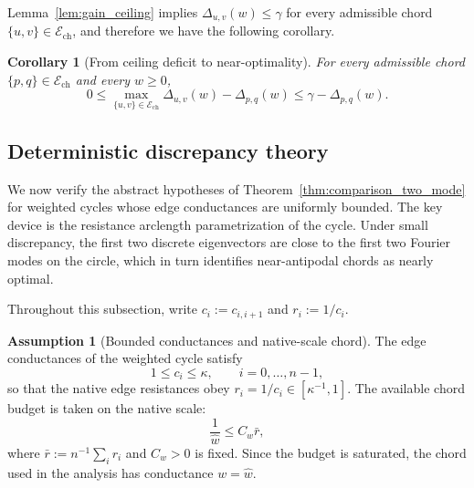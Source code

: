 \documentclass[11pt]{article}
\numberwithin{equation}{section}
\newtheorem{corollary}[theorem]{Corollary}
\theoremstyle{definition}
\newtheorem{assumption}[theorem]{Assumption}
\theoremstyle{remark}
\begin{document}
Lemma~\ref{lem:gain_ceiling} implies
$\Delta_{u,v}(w)\le \gamma$ for every admissible chord
$\{u,v\}\in\mathcal{E}_{\mathrm{ch}}$, and therefore we have the following corollary.

\begin{corollary}[From ceiling deficit to near-optimality]\label{cor:ceiling_to_opt}
	For every admissible chord $\{p,q\}\in\mathcal{E}_{\mathrm{ch}}$ and every $w\ge 0$,
	\begin{equation}\label{eq:near_opt_from_ceiling}
		0\le
		\max_{\{u,v\}\in\mathcal{E}_{\mathrm{ch}}}\Delta_{u,v}(w)-\Delta_{p,q}(w)
		\le
		\gamma-\Delta_{p,q}(w).
	\end{equation}
\end{corollary}



\subsection{Deterministic discrepancy theory}\label{subsec:deterministic_discrepancy}

We now verify the abstract hypotheses of
Theorem~\ref{thm:comparison_two_mode} for weighted cycles whose edge
conductances are uniformly bounded. The key device is the resistance
arclength parametrization of the cycle. Under small discrepancy, the first
two discrete eigenvectors are close to the first two Fourier modes on the
circle, which in turn identifies near-antipodal chords as nearly optimal.

Throughout this subsection, write $c_i:=c_{i,i+1}$ and $r_i:=1/c_i$.

\begin{assumption}[Bounded conductances and native-scale chord]\label{ass:deterministic}
	The edge conductances of the weighted cycle satisfy
	\begin{equation}\label{eq:det_kappa_bounds}
		1\le c_i\le \kappa,
		\qquad i=0,\dots,n-1,
	\end{equation}
	so that the native edge resistances obey $r_i=1/c_i\in[\kappa^{-1},1]$.
	The available chord budget is taken on the native scale:
	\begin{equation}\label{eq:w_native_scale}
		\frac{1}{\hat w}\le C_w\bar r ,
	\end{equation}
	where $\bar r:=n^{-1}\sum_i r_i$ and $C_w>0$ is fixed. Since the budget is saturated, the chord used in the analysis has conductance $w=\hat w$.
\end{assumption}
\end{document}
